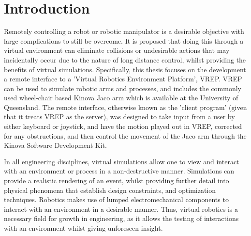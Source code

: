 \documentclass[12pt,openany,a4paper]{book}
\begin{document}
\tableofcontents

\listoffigures
{}

\listoftables
{}

% 

\cleardoublepage

\mainmatter


%
%
%
%	
%	

\chapter{Introduction}
Remotely controlling a robot or robotic manipulator is a desirable objective with large complications to still be overcome. It is proposed that doing this through a virtual environment can eliminate collisions or undesirable actions that may incidentally occur due to the nature of long distance control, whilst providing the benefits of virtual simulations. Specifically, this thesis focuses on the development a remote interface to a 'Virtual Robotics Environment Platform', VREP. VREP can be used to simulate robotic arms and processes, and includes the commonly used wheel-chair based Kinova Jaco arm which is available at the University of Queensland. The remote interface, otherwise known as the 'client program' (given that it treats VREP as the server), was designed to take input from a user by either keyboard or joystick, and have the motion played out in VREP, corrected for any obstructions, and then control the movement of the Jaco arm through the Kinova Software Development Kit.

In all engineering disciplines, virtual simulations allow one to view and interact with an environment or process in a non-destructive manner. Simulations can provide a realistic rendering of an event, whilst providing further detail into physical phenomena that establish design constraints, and optimization techniques. Robotics makes use of lumped electromechanical components to interact with an environment in a desirable manner. Thus, virtual robotics is a necessary field for growth in engineering, as it allows the testing of interactions with an environment whilst giving unforeseen insight.
\end{document}
